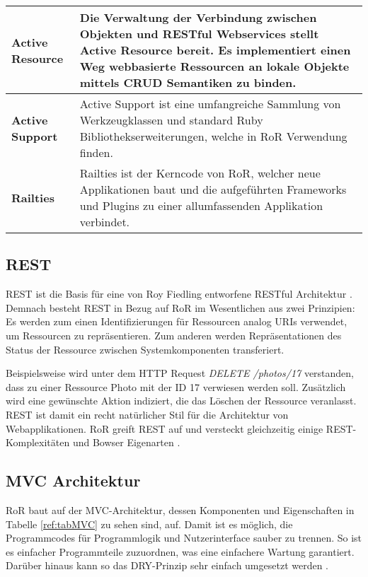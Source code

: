\begin{longtable}{|p{1.8cm}|p{12.5cm}|}
\textbf{Active Resource}&Die Verwaltung der Verbindung zwischen Objekten
und RESTful Webservices stellt Active Resource bereit. Es implementiert
einen Weg webbasierte Ressourcen an lokale Objekte mittels CRUD Semantiken zu
binden.\\\hline

\textbf{Active Support}&Active Support ist eine umfangreiche Sammlung
von Werkzeugklassen und standard Ruby Bibliothekserweiterungen, welche
in RoR Verwendung finden.\\\hline

\textbf{Railties}&Railties ist der Kerncode von RoR, welcher neue
Applikationen baut und die aufgeführten Frameworks und Plugins zu einer
allumfassenden Applikation verbindet.\\\hline

\end{longtable}

\subsection{REST}\label{ref:basREST}
REST ist die Basis für eine von Roy Fiedling entworfene RESTful Architektur
\cite{fiedling:2000}. Demnach besteht REST in Bezug auf RoR im Wesentlichen aus
zwei Prinzipien: Es werden zum einen Identifizierungen für Ressourcen analog
\ac{URI}s verwendet, um Ressourcen zu repräsentieren. Zum anderen werden
Repräsentationen des Status der Ressource zwischen Systemkomponenten
transferiert.

Beispielsweise wird unter dem HTTP Request \textit{DELETE /photos/17}
verstanden, dass zu einer Ressource Photo mit der ID 17 verwiesen werden soll.
Zusätzlich wird eine gewünschte Aktion indiziert, die das Löschen der Ressource
veranlasst. REST ist damit ein recht natürlicher Stil für die Architektur von
Webapplikationen. RoR greift REST auf und versteckt gleichzeitig einige
REST-Komplexitäten und Bowser Eigenarten \cite{railsGuides:2013}.

\subsection{MVC Architektur}\label{ref:basMVC}
\ac{RoR} baut auf der \ac{MVC}-Architektur, dessen Komponenten und Eigenschaften
in Tabelle \ref{ref:tabMVC} zu sehen sind, auf. Damit ist es möglich, die
Programmcodes für Programmlogik und Nutzerinterface sauber zu trennen. So ist es
einfacher Programmteile zuzuordnen, was eine einfachere Wartung garantiert.
Darüber hinaus kann so das \ac{DRY}-Prinzip sehr einfach umgesetzt werden
\cite{railsGuides:2013}.

